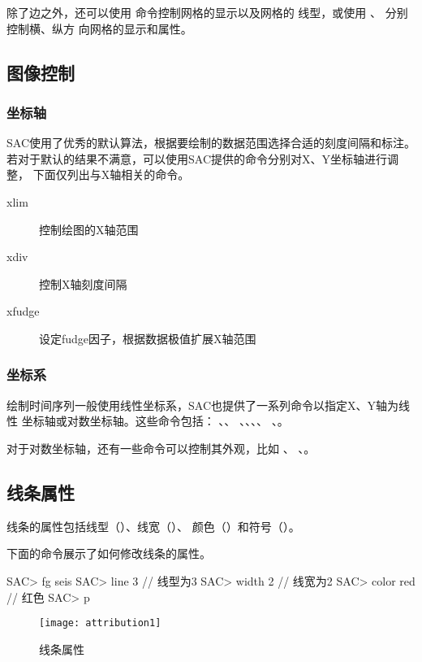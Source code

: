 除了边之外，还可以使用  命令控制网格的显示以及网格的
线型，或使用 、 分别控制横、纵方
向网格的显示和属性。

\subsection{图像控制}
\subsubsection{坐标轴}
SAC使用了优秀的默认算法，根据要绘制的数据范围选择合适的刻度间隔和标注。
若对于默认的结果不满意，可以使用SAC提供的命令分别对X、Y坐标轴进行调整，
下面仅列出与X轴相关的命令。
\begin{description}
\item [xlim] 控制绘图的X轴范围
\item [xdiv] 控制X轴刻度间隔
\item [xfudge] 设定fudge因子，根据数据极值扩展X轴范围
\end{description}

\subsubsection{坐标系}
绘制时间序列一般使用线性坐标系，SAC也提供了一系列命令以指定X、Y轴为线性
坐标轴或对数坐标轴。这些命令包括： 、、
、、、、
、。

对于对数坐标轴，还有一些命令可以控制其外观，比如 、
、。

\subsection{线条属性}
\label{subsec:line-attribution}

线条的属性包括线型（）、线宽（）、
颜色（）和符号（）。

下面的命令展示了如何修改线条的属性。
\begin{SACCode}
SAC> fg seis
SAC> line 3         // 线型为3
SAC> width 2        // 线宽为2
SAC> color red      // 红色
SAC> p
\end{SACCode}

\begin{figure}[H]
\centering
\texttt{[image: attribution1]}
\caption{线条属性}
\end{figure}

